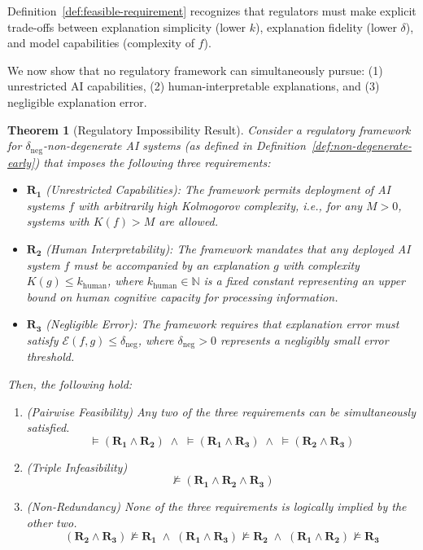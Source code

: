 \documentclass[11pt,letter,leqno]{article}
\newtheorem{theorem}{Theorem}[section]
\begin{document}
Definition~\ref{def:feasible-requirement} recognizes that regulators must make explicit trade-offs between explanation simplicity (lower $k$), explanation fidelity (lower $\delta$), and model capabilities (complexity of $f$).

We now show that no regulatory framework can simultaneously pursue: (1) unrestricted AI capabilities, (2) human-interpretable explanations, and (3) negligible explanation error.

\begin{theorem}[Regulatory Impossibility Result]
\label{thm:impossibility}
Consider a regulatory framework for $\delta_{\text{neg}}$-non-degenerate AI systems (as defined in 
Definition~\ref{def:non-degenerate-early}) that imposes the following three requirements:

\begin{itemize}

\item $\mathbf{R_1}$ (Unrestricted Capabilities): The framework permits deployment of AI systems $f$ with arbitrarily high Kolmogorov complexity, i.e., for any $M > 0$, systems with $K(f) > M$ are allowed.

\item $\mathbf{R_2}$ (Human Interpretability): The framework mandates that any deployed AI system $f$ must be accompanied by an explanation $g$ with complexity $K(g) \leq k_{\text{human}}$, where $k_{\text{human}} \in \mathbb{N}$ is a fixed constant representing an upper bound on human cognitive capacity for processing information.

\item $\mathbf{R_3}$ (Negligible Error): The framework requires that explanation error must satisfy $\mathcal{E}(f, g) \leq \delta_{\text{neg}}$, where $\delta_{\text{neg}} > 0$ represents a negligibly small error threshold.

\end{itemize}
  
Then, the following hold:

\begin{enumerate}
\item \emph{(Pairwise Feasibility)} Any two of the three requirements can be 
simultaneously satisfied.
\[
 \models (\mathbf{R_1} \land \mathbf{R_2})
\;\wedge\;
 \models (\mathbf{R_1} \land \mathbf{R_3})
\;\wedge\;
 \models (\mathbf{R_2} \land \mathbf{R_3})
\]

\item \emph{(Triple Infeasibility)}
\[
\nvDash (\mathbf{R_1} \land \mathbf{R_2} \land \mathbf{R_3})
\]
  
\item \emph{(Non-Redundancy)} None of the three requirements is logically 
implied by the other two.
\[
(\mathbf{R_2} \land \mathbf{R_3}) \nvDash \mathbf{R_1}
\;\wedge\;
(\mathbf{R_1} \land \mathbf{R_3}) \nvDash \mathbf{R_2}
\;\wedge\;
(\mathbf{R_1} \land \mathbf{R_2}) \nvDash \mathbf{R_3}
\]

\end{enumerate}

\end{theorem}
\end{document}
